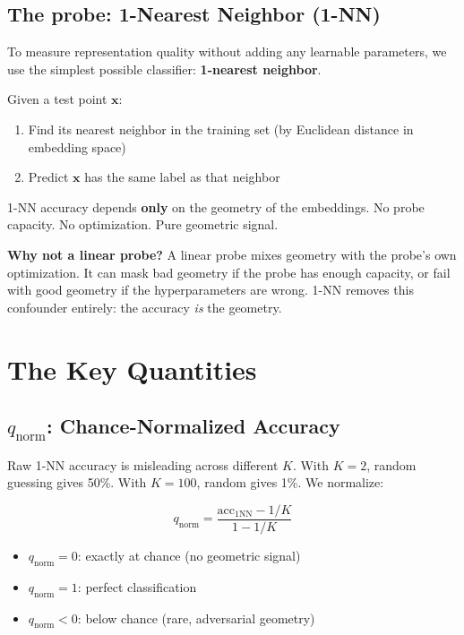 \documentclass[11pt,a4paper]{article}
\begin{document}
\subsection{The probe: 1-Nearest Neighbor (1-NN)}

To measure representation quality without adding any learnable parameters, we use the simplest possible classifier: \textbf{1-nearest neighbor}.

\begin{keybox}[1-NN Classification]
Given a test point $\mathbf{x}$:
\begin{enumerate}[nosep]
\item Find its nearest neighbor in the training set (by Euclidean distance in embedding space)
\item Predict $\mathbf{x}$ has the same label as that neighbor
\end{enumerate}
1-NN accuracy depends \textbf{only} on the geometry of the embeddings. No probe capacity. No optimization. Pure geometric signal.
\end{keybox}

\textbf{Why not a linear probe?} A linear probe mixes geometry with the probe's own optimization. It can mask bad geometry if the probe has enough capacity, or fail with good geometry if the hyperparameters are wrong. 1-NN removes this confounder entirely: the accuracy \emph{is} the geometry.

\section{The Key Quantities}

\subsection{$q_{\mathrm{norm}}$: Chance-Normalized Accuracy}

Raw 1-NN accuracy is misleading across different $K$. With $K{=}2$, random guessing gives 50\%. With $K{=}100$, random gives 1\%. We normalize:

\begin{keybox}
\vspace{-0.3cm}
\begin{equation}
q_{\mathrm{norm}} = \frac{\mathrm{acc}_{1\mathrm{NN}} - 1/K}{1 - 1/K}
\end{equation}
\begin{itemize}[nosep]
\item $q_{\mathrm{norm}} = 0$: exactly at chance (no geometric signal)
\item $q_{\mathrm{norm}} = 1$: perfect classification
\item $q_{\mathrm{norm}} < 0$: below chance (rare, adversarial geometry)
\end{itemize}
\end{keybox}
\end{document}
